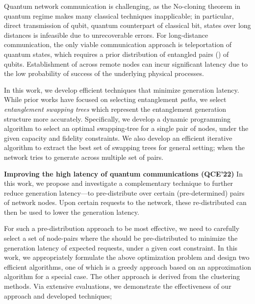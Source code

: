 Quantum network communication is challenging, as the No-cloning theorem in quantum regime makes many classical techniques inapplicable; in particular, 
direct transmission of qubit, quantum counterpart of classical bit, states over long distances is infeasible
due to unrecoverable errors.
For long-distance communication, the only viable communication approach is teleportation of quantum states, which requires a prior distribution of entangled pairs (\epss) of qubits.
Establishment of \epss across remote nodes can incur significant latency due to the low probability of success of the underlying physical processes. 

In this work, we develop efficient techniques that minimize \eps generation latency. While prior works
have focused on selecting entanglement \textit{paths}, we select \emph{entanglement swapping trees} which represent the entanglement generation structure more accurately.
Specifically, we develop a dynamic programming algorithm to select an optimal swapping-tree for a single pair of nodes, under the given capacity and fidelity constraints.
We also develop an efficient iterative algorithm to extract the best set of swapping trees for general setting; when the network tries to generate \epss across multiple set of pairs.



\vspace{6pt}\noindent \textbf{Improving the high latency of quantum communications (QCE'22)}
In this work, we propose and investigate a complementary technique to further reduce \eps generation latency---to pre-distribute \epss over certain (pre-determined) pairs of network nodes. 
Upon certain requests to the network, these re-distributed \epss can then be used to lower the generation latency.

For such a pre-distribution approach to be most effective, we need to carefully select a set of node-pairs where
the \epss should be pre-distributed to minimize the generation latency of expected \eps requests, under a given cost constraint.
In this work,
we appropriately formulate the above optimization problem and design two
efficient algorithms, one of which is a greedy approach based on an 
approximation algorithm for a special case. 
The other approach is derived from the clustering methods.
Via extensive evaluations, we demonstrate the effectiveness of our approach and developed techniques;  


